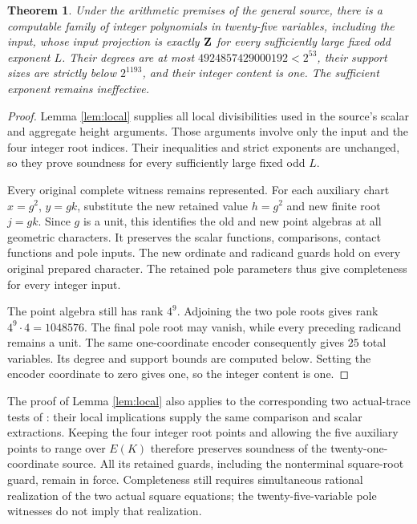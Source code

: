 \documentclass[11pt,a4paper]{article}
\newtheorem{theorem}{Theorem}\newtheorem{lemma}[theorem]{Lemma}
\begin{document}
\begin{theorem}\label{thm:main}
Under the arithmetic premises of the general source, there is a
computable family of integer polynomials in twenty-five variables,
including the input, whose input projection is exactly $\mathbf Z$ for
every sufficiently large fixed odd exponent $L$. Their degrees
are at most $4924857429000192<2^{53}$, their support sizes are
strictly below $2^{1193}$, and their integer content is one.
The sufficient exponent remains ineffective.
\end{theorem}
\begin{proof}
Lemma \ref{lem:local} supplies all local divisibilities used in
the source's scalar and aggregate height arguments. Those arguments
involve only the input and the four integer root indices. Their
inequalities and strict exponents are unchanged, so they prove
soundness for every sufficiently large fixed odd $L$.

Every original complete witness remains represented. For each
auxiliary chart $x=g^2$, $y=gk$, substitute the new retained value
$h=g^2$ and new finite root $j=gk$. Since $g$ is a unit, this
identifies the old and new point algebras at all geometric
characters. It preserves the scalar functions, comparisons,
contact functions and pole inputs. The new ordinate and radicand
guards hold on every original prepared character. The retained
pole parameters thus give completeness for every integer input.

The point algebra still has rank $4^9$. Adjoining the two pole
roots gives rank $4^9\cdot4=1048576$. The final pole root may
vanish, while every preceding radicand remains a unit. The same
one-coordinate encoder consequently gives $25$ total variables.
Its degree and support bounds are computed below. Setting the
encoder coordinate to zero gives one, so the integer content is one.
\end{proof}

The proof of Lemma \ref{lem:local} also applies to the corresponding
two actual-trace tests of \cite{Trace}: their local implications supply the same
comparison and scalar extractions. Keeping the four integer root
points and allowing the five auxiliary points to range over $E(K)$
therefore preserves soundness of the twenty-one-coordinate source.
All its retained guards, including the nonterminal square-root
guard, remain in force. Completeness still requires simultaneous
rational realization of the two actual square equations; the
twenty-five-variable pole witnesses do not imply that realization.
\end{document}
